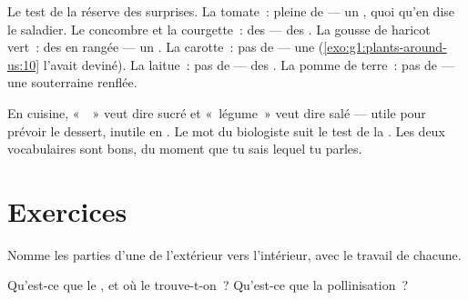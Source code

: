 \begin{example}\label{ex:g3:flowers-fruits-seeds:surprise}
Le test de la  réserve des surprises. La tomate~: pleine de
 --- un , quoi qu'en dise le saladier. Le concombre et
la courgette~: des  --- des . La gousse de haricot
vert~: des  en rangée --- un . La carotte~: pas de
 --- une  (\cref{exo:g1:plants-around-us:10} l'avait
deviné). La laitue~: pas de  --- des . La pomme de
terre~: pas de  --- une  souterraine renflée.
\end{example}

\begin{remark}\label{rem:g3:flowers-fruits-seeds:words}
En cuisine, «~~» veut dire sucré et «~légume~» veut dire salé
--- utile pour prévoir le dessert, inutile en . Le mot du
biologiste suit le test de la . Les deux vocabulaires sont
bons, du moment que tu sais lequel tu parles.
\end{remark}

\section{Exercices}

\begin{exercise}[$\star$]\label{exo:g3:flowers-fruits-seeds:1}
Nomme les parties d'une  de l'extérieur vers l'intérieur, avec
le travail de chacune.
\end{exercise}

\begin{exercise}[$\star$]\label{exo:g3:flowers-fruits-seeds:2}
Qu'est-ce que le , et où le trouve-t-on~? Qu'est-ce que la
pollinisation~?
\end{exercise}

